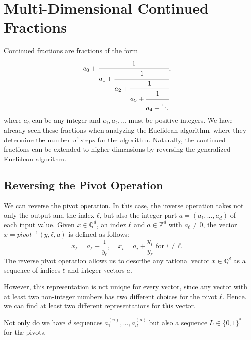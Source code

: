 \chapter{Multi-Dimensional Continued Fractions}

Continued fractions are fractions of the form
\[
  a_0 + \cfrac{1}{a_1 + \cfrac{1}{a_2 + \cfrac{1}{a_3 + \cfrac{1}{a_4 + \ddots}}}},
\]
where $a₀$ can be any integer and $a₁, a₂, \dots$ must be positive integers.
We have already seen these fractions when analyzing the Euclidean algorithm,
where they determine the number of steps for the algorithm.
Naturally, the continued fractions can be extended to higher dimensions by
reversing the generalized Euclidean algorithm.

\section{Reversing the Pivot Operation}

We can reverse the pivot operation.
In this case, the inverse operation takes not only the output and the index $ℓ$,
but also the integer part $a = (a₁, \dots, a_d)$ of each input value.
Given $x ∈ ℚ^d$, an index $ℓ$ and $a ∈ ℤ^d$ with $a_ℓ ≠ 0$,
the vector $x = pivot^{-1}(y, ℓ, a)$ is defined as follows:
\[
  x_ℓ = a_ℓ + \frac{1}{y_ℓ}, \quad x_i = a_i + \frac{y_i}{y_ℓ} \text{ for } i ≠ ℓ.
\]
The reverse pivot operation allows us to describe any rational vector $x ∈ ℚ^d$ as a
sequence of indices $ℓ$ and integer vectors $a$.

However, this representation is not unique for every vector,
since any vector with at least two non-integer numbers has two different
choices for the pivot $ℓ$.
Hence, we can find at least two different representations for this vector.

Not only do we have $d$ sequences $a_1^{(n)}, \dots, a_d^{(n)}$ but also a
sequence $L ∈ \{0,1\}^*$ for the pivots.

